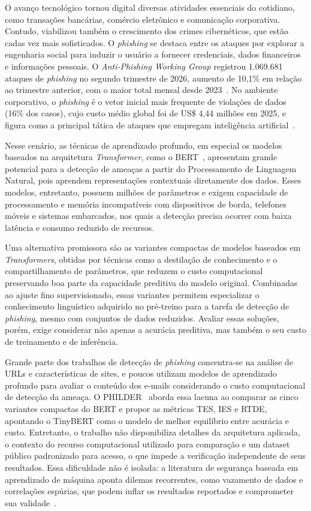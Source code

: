 \documentclass[12pt]{article}
\begin{document}
        O avanço tecnológico tornou digital diversas atividades essenciais do cotidiano, como transações bancárias, comércio eletrônico e comunicação corporativa. Contudo, viabilizou também o crescimento dos crimes cibernéticos, que estão cadas vez mais sofisticados. O  \textit{phishing} se destaca entre os ataques por explorar a engenharia social para induzir o usuário a fornecer credenciais, dados financeiros e informações pessoais. O \textit{Anti-Phishing Working Group} registrou 1.069.681 ataques de \textit{phishing} no segundo trimestre de 2026, aumento de 10,1\% em relação ao trimestre anterior, com o maior total mensal desde 2023~\cite{apwg2026q2}. No ambiente corporativo, o \textit{phishing} é o vetor inicial mais frequente de violações de dados (16\% dos casos), cujo custo médio global foi de US\$ 4,44 milhões em 2025, e figura como a principal tática de ataques que empregam inteligência artificial~\cite{ibm2025cost}.

        Nesse cenário, as técnicas de aprendizado profundo, em especial os modelos baseados na arquitetura \textit{Transformer}, como o BERT~\cite{devlin2019bert}, apresentam grande potencial para a detecção de ameaças a partir do Processamento de Linguagem Natural, pois aprendem representações contextuais diretamente dos dados. Esses modelos, entretanto, possuem milhões de parâmetros e exigem capacidade de processamento e memória  incompatíveis com dispositivos de borda, telefones móveis e sistemas embarcados, nos quais a detecção precisa ocorrer com baixa latência e consumo reduzido de recursos. 

       Uma alternativa promissora são as variantes compactas de modelos baseados em \textit{Transformers}, obtidas por técnicas como a destilação de conhecimento e o compartilhamento de parâmetros, que reduzem o custo computacional preservando boa parte da capacidade preditiva do modelo original. Combinadas ao ajuste fino supervisionado, essas variantes permitem especializar o conhecimento linguístico adquirido no pré-treino para a tarefa de detecção de \textit{phishing}, mesmo com conjuntos de dados reduzidos. Avaliar essas soluções, porém, exige considerar não apenas a acurácia preditiva, mas também o seu custo de treinamento e de inferência.
       
        Grande parte dos trabalhos de detecção de \textit{phishing} concentra-se na análise de URLs e características de sites, e poucos utilizam modelos de aprendizado profundo para avaliar o conteúdo dos e-mails considerando o custo computacional de detecção da ameaça. O PHILDER~\cite{bispo2025philder} aborda essa lacuna ao comparar as cinco variantes compactas do BERT e propor as métricas TES, IES e RTDE, apontando o TinyBERT como o modelo de melhor equilíbrio entre acurácia e custo. Entretanto, o trabalho não disponibiliza detalhes da arquitetura aplicada, o contexto do recurso computacional utilizado para comparação e um dataset público padronizado para acesso, o que impede a verificação independente de seus resultados. Essa dificuldade não é isolada: a literatura de segurança baseada em aprendizado de máquina aponta dilemas recorrentes, como vazamento de dados e correlações espúrias, que podem inflar os resultados reportados e comprometer sua validade~\cite{arp2022dos}.
\end{document}

